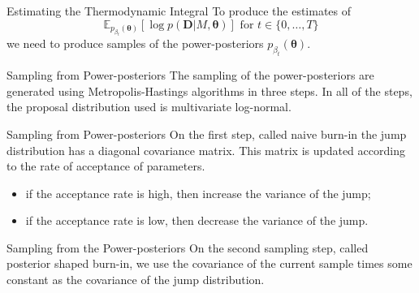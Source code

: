 \documentclass{beamer}
\newcommand{\expectation}{\mathbb{E}}
\begin{document}
\begin{frame}{Estimating the Thermodynamic Integral}
To produce the estimates of 
\begin{equation*}
    \expectation_{p_{\beta_{t}} ({\bm \theta})}[\log p({\bm D}| M, {\bm
    \theta})]
    \text{ for }
    t \in \{0, \ldots, T\}
\end{equation*}    
we need to produce samples of the 
power-posteriors $p_{\beta_{t}} ({\bm \theta})$.
\end{frame}

%
%
%
%
\begin{frame}{Sampling from Power-posteriors}
The sampling of the power-posteriors are generated using 
Metropolis-Hastings algorithms in three steps. \pause In all of the 
steps, the proposal distribution used is multivariate log-normal.
\end{frame}


\begin{frame}{Sampling from Power-posteriors}
On the first step, called \alert{naive burn-in} the jump distribution 
has a diagonal covariance matrix. \pause This matrix is updated 
according to the rate of acceptance of parameters.

\pause
\begin{itemize}
\item{if the acceptance rate is high, then increase the variance of the
    jump;}

\pause
\item{if the acceptance rate is low, then decrease the variance of the 
    jump.}
\end{itemize}

\pause
\end{frame}

\begin{frame}{Sampling from the Power-posteriors}
On the second sampling step, called \alert{posterior shaped burn-in}, we
use the covariance of the current sample times some constant as the 
covariance of the jump distribution.
\end{frame}
\end{document}
